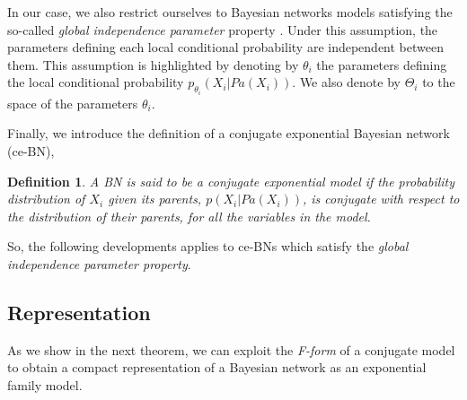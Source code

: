 \documentclass[11pt, oneside]{article}   	%
\newtheorem{mydef}{Definition}
\numberwithin{figure}{section}
\numberwithin{equation}{section}
\numberwithin{table}{section}
\theoremstyle{definition}
\begin{document}
In our case, we also restrict ourselves to Bayesian networks models satisfying the so-called \emph{global independence parameter} property \cite{heckerman1995learning}. Under this assumption, the parameters defining each local conditional probability are independent between them. This assumption is highlighted by denoting by $\theta_i$ the parameters defining the local conditional probability $p_{\theta_i}(X_i|Pa(X_i))$. We also denote by $\Theta_i$ to the space of the parameters $\theta_i$.

Finally, we introduce the definition of a conjugate exponential Bayesian network (ce-BN),

\begin{mydef}
A BN is said to be a conjugate exponential model if the probability distribution of $X_i$ given its parents, $p(X_i|Pa(X_i))$, is conjugate with respect to the distribution of their parents, for all the variables in the model.  
\end{mydef}

So, the following developments applies to ce-BNs which satisfy the \emph{global independence parameter property}.

\subsection{Representation} \label{Section:CEFBN:Representation}

As we show in the next theorem, we can exploit the \textit{F-form} of a conjugate model to obtain a compact representation of a Bayesian network as an exponential family model. 
\end{document}
